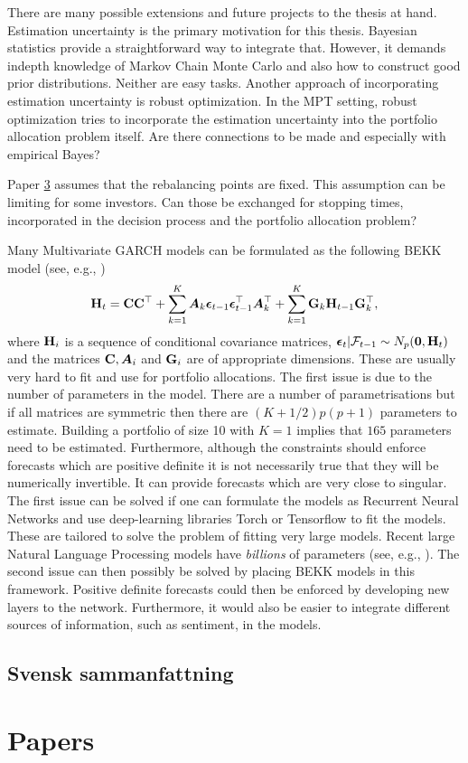 \documentclass[12pt, oneside]{book}\usepackage{knitr}
\begin{document}
There are many possible extensions and future projects to the thesis at hand.
Estimation uncertainty is the primary motivation for this thesis.
Bayesian statistics provide a straightforward way to integrate that. 
However, it demands indepth knowledge of Markov Chain Monte Carlo and also how to construct good prior distributions.
Neither are easy tasks.
Another approach of incorporating estimation uncertainty is robust optimization.
In the MPT setting, robust optimization tries to incorporate the estimation uncertainty into the portfolio allocation problem itself.
Are there connections to be made and especially with empirical Bayes?

Paper \hyperref[sec:paper3]{3} assumes that the rebalancing points are fixed.
This assumption can be limiting for some investors.
Can those be exchanged for stopping times, incorporated in the decision process and the portfolio allocation problem?

Many Multivariate GARCH models can be formulated as the following BEKK model (see, e.g., \citet{engle1995multivariate})
\begin{equation}\label{eqn:BEKK}
  \mathbf{H}_t = \mathbf{C} \mathbf{C}^\top + \sum_{k=1}^K \mbox{\boldmath$A$}_k \boldsymbol{\epsilon}_{t-1}\boldsymbol{\epsilon}_{t-1}^\top \mbox{\boldmath$A$}_k^\top + \sum_{k=1}^K \mathbf{G}_k \mathbf{H}_{t-1}\mathbf{G}_k^\top,
\end{equation}
where $\mathbf{H}_i$ is a sequence of conditional covariance matrices, $\boldsymbol{\epsilon}_t | \mathcal{F}_{t-1} \sim N_p(\mathbf{0}, \mathbf{H}_t)$ and the matrices $\mathbf{C}, \mbox{\boldmath$A$}_i$ and $\mathbf{G}_i$ are of appropriate dimensions.
These are usually very hard to fit and use for portfolio allocations. 
The first issue is due to the number of parameters in the model.
There are a number of parametrisations but if all matrices are symmetric then there are $(K+1/2)p(p+1)$ parameters to estimate. 
Building a portfolio of size 10 with $K=1$ implies that $165$ parameters need to be estimated.
Furthermore, although the constraints should enforce forecasts which are positive definite it is not necessarily true that they will be numerically invertible.
It can provide forecasts which are very close to singular.
The first issue can be solved if one can formulate the models as Recurrent Neural Networks and use deep-learning libraries Torch or Tensorflow to fit the models. 
These are tailored to solve the problem of fitting very large models.
Recent large Natural Language Processing models have \textit{billions} of parameters (see, e.g., \citet{brown2020language}). 
The second issue can then possibly be solved by placing BEKK models in this framework.
Positive definite forecasts could then be enforced by developing new layers to the network. 
Furthermore, it would also be easier to integrate different sources of information, such as sentiment, in the models.

\chapter{Svensk sammanfattning}


\backmatterSU

\printbibliography[keyword={ref_list}]
\part{Papers}
\end{document}

